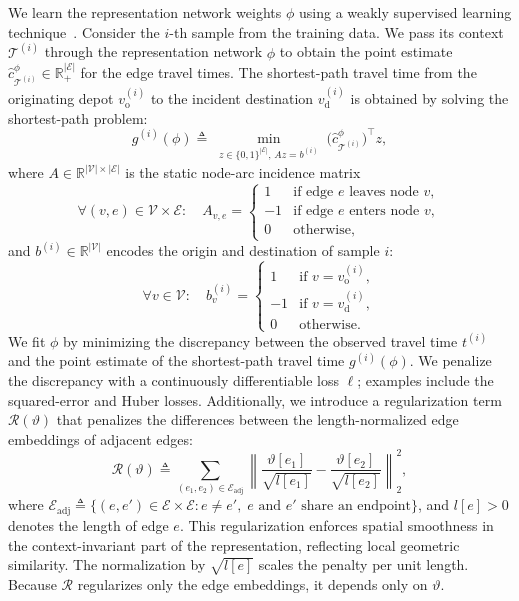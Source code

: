 \documentclass[11pt, letterpaper, oneside, reqno]{amsart}
\newcommand{\R}{\mathbb{R}}
\newcommand{\Let}{\triangleq}
\begin{document}
We learn the representation network weights $\phi$ using a weakly supervised learning technique~\cite{ref:zhou2018brief}. Consider the $i$-th sample from the training data. We pass its context $\mathcal T^{(i)}$ through the representation network $\phi$ to obtain the point estimate $\hat c_{\mathcal T^{(i)}}^\phi \in \R_+^{|\mathcal E|}$ for the edge travel times. The shortest-path travel time from the originating depot $v^{(i)}_{\mathrm{o}}$ to the incident destination $v^{(i)}_{\mathrm{d}}$ is obtained by solving the shortest-path problem:
\begin{equation}
g^{(i)}(\phi) \Let \min_{\substack{z \in \{0,1\}^{|\mathcal E|},\, A z = b^{(i)}}}
\bigl(\hat c_{\mathcal T^{(i)}}^\phi\bigr)^\top z,
\label{eq:gi-def}
\end{equation}
where  $A \in \R^{|\mathcal V| \times |\mathcal E|}$ is the static node-arc incidence matrix
\[
\forall (v,e)\in\mathcal V\times\mathcal E:\quad 
A_{v,e} =
\begin{cases}
  1 & \text{if edge } e \text{ leaves node } v,\\
 -1 & \text{if edge } e \text{ enters node } v,\\
  0 & \text{otherwise,}
\end{cases}
\]
and $b^{(i)} \in \R^{|\mathcal V|}$ encodes the origin and destination of sample $i$:
\[
\forall v \in \mathcal V:\quad
b_v^{(i)} =
\begin{cases}
  1 & \text{if } v = v^{(i)}_{\mathrm{o}},\\
 -1 & \text{if } v = v^{(i)}_{\mathrm{d}},\\
  0 & \text{otherwise.}
\end{cases}
\]
We fit $\phi$ by minimizing the discrepancy between the observed travel time $t^{(i)}$ and the point estimate of the shortest-path travel time $g^{(i)}(\phi)$. We penalize the discrepancy with a continuously differentiable loss $\ell$; examples include the squared-error and Huber losses.
Additionally, we introduce a regularization term $\mathcal R(\vartheta)$ that penalizes the differences between the length-normalized edge embeddings of adjacent edges:
\begin{equation}
\mathcal R(\vartheta) \Let \sum_{(e_1,e_2)\in \mathcal E_{\mathrm{adj}}} \left\| \frac{\vartheta[e_1]}{\sqrt{l[e_1]}} - \frac{\vartheta[e_2]}{\sqrt{l[e_2]}} \right\|_2^2,
\label{eq:regularization}
\end{equation}
where $\mathcal E_{\mathrm{adj}} \Let \bigl\{(e,e')\in\mathcal E\times\mathcal E: e\neq e', \; e \text{ and } e' \text{ share an endpoint}\bigr\}$, and $l[e]>0$ denotes the length of edge $e$.
This regularization enforces spatial smoothness in the context-invariant part of the representation, reflecting local geometric similarity. The normalization by $\sqrt{l[e]}$ scales the penalty per unit length.
Because $\mathcal R$ regularizes only the edge embeddings, it depends only on $\vartheta$.
\end{document}
